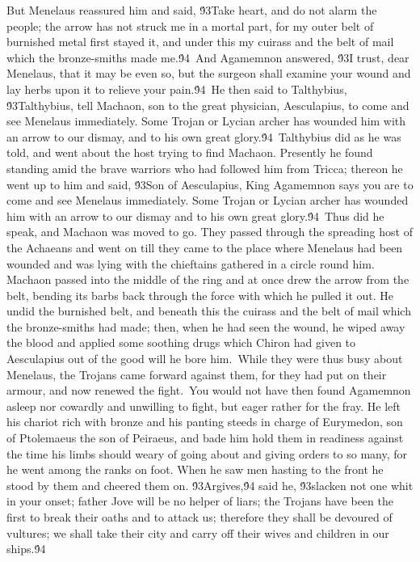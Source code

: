 {But Menelaus reassured him and said, \'93Take heart, and do not alarm the people; the arrow has not struck me in a mortal part, for my outer belt of burnished metal first stayed it, and under this my cuirass and the belt of mail which the bronze-smiths made me.\'94\
And Agamemnon answered, \'93I trust, dear Menelaus, that it may be even so, but the surgeon shall examine your wound and lay herbs upon it to relieve your pain.\'94\
He then said to Talthybius, \'93Talthybius, tell Machaon, son to the great physician, Aesculapius, to come and see Menelaus immediately. Some Trojan or Lycian archer has wounded him with an arrow to our dismay, and to his own great glory.\'94\
Talthybius did as he was told, and went about the host trying to find Machaon. Presently he found standing amid the brave warriors who had followed him from Tricca; thereon he went up to him and said, \'93Son of Aesculapius, King Agamemnon says you are to come and see Menelaus immediately. Some Trojan or Lycian archer has wounded him with an arrow to our dismay and to his own great glory.\'94\
Thus did he speak, and Machaon was moved to go. They passed through the spreading host of the Achaeans and went on till they came to the place where Menelaus had been wounded and was lying with the chieftains gathered in a circle round him. Machaon passed into the middle of the ring and at once drew the arrow from the belt, bending its barbs back through the force with which he pulled it out. He undid the burnished belt, and beneath this the cuirass and the belt of mail which the bronze-smiths had made; then, when he had seen the wound, he wiped away the blood and applied some soothing drugs which Chiron had given to Aesculapius out of the good will he bore him.\
While they were thus busy about Menelaus, the Trojans came forward against them, for they had put on their armour, and now renewed the fight.\
You would not have then found Agamemnon asleep nor cowardly and unwilling to fight, but eager rather for the fray. He left his chariot rich with bronze and his panting steeds in charge of Eurymedon, son of Ptolemaeus the son of Peiraeus, and bade him hold them in readiness against the time his limbs should weary of going about and giving orders to so many, for he went among the ranks on foot. When he saw men hasting to the front he stood by them and cheered them on. \'93Argives,\'94 said he, \'93slacken not one whit in your onset; father Jove will be no helper of liars; the Trojans have been the first to break their oaths and to attack us; therefore they shall be devoured of vultures; we shall take their city and carry off their wives and children in our ships.\'94\
}
